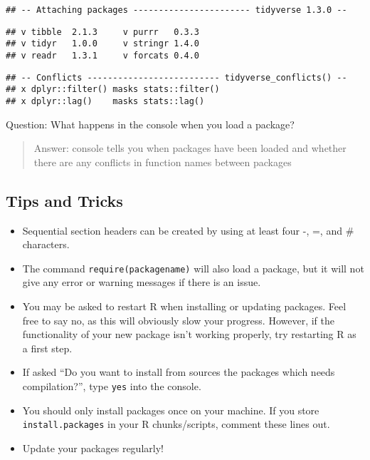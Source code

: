 \documentclass[
]{article}
\begin{document}
\begin{verbatim}
## -- Attaching packages ----------------------- tidyverse 1.3.0 --
\end{verbatim}

\begin{verbatim}
## v tibble  2.1.3     v purrr   0.3.3
## v tidyr   1.0.0     v stringr 1.4.0
## v readr   1.3.1     v forcats 0.4.0
\end{verbatim}

\begin{verbatim}
## -- Conflicts -------------------------- tidyverse_conflicts() --
## x dplyr::filter() masks stats::filter()
## x dplyr::lag()    masks stats::lag()
\end{verbatim}

Question: What happens in the console when you load a package?

\begin{quote}
Answer: console tells you when packages have been loaded and whether
there are any conflicts in function names between packages
\end{quote}

\hypertarget{tips-and-tricks}{%
\subsection{Tips and Tricks}\label{tips-and-tricks}}

\begin{itemize}
\item
  Sequential section headers can be created by using at least four -, =,
  and \# characters.
\item
  The command \texttt{require(packagename)} will also load a package,
  but it will not give any error or warning messages if there is an
  issue.
\item
  You may be asked to restart R when installing or updating packages.
  Feel free to say no, as this will obviously slow your progress.
  However, if the functionality of your new package isn't working
  properly, try restarting R as a first step.
\item
  If asked ``Do you want to install from sources the packages which
  needs compilation?'', type \texttt{yes} into the console.
\item
  You should only install packages once on your machine. If you store
  \texttt{install.packages} in your R chunks/scripts, comment these
  lines out.
\item
  Update your packages regularly!
\end{itemize}
\end{document}
